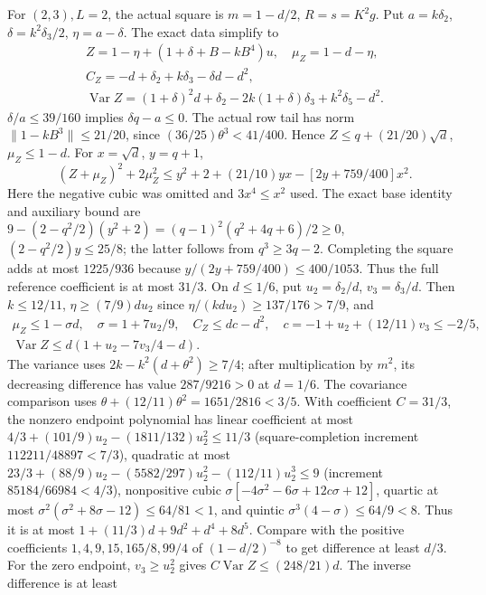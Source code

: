 For $(2,3),L=2$, the actual square is $m=1-d/2$, $R=s=K^2g$.
Put $a=k\delta_2$, $\delta=k^2\delta_3/2$, $\eta=a-\delta$.
The exact data simplify to
\begin{equation}\tag{L77.2.1}\label{eq:L77:23}
\begin{gathered}
Z=1-\eta+(1+\delta+B-kB^4)u,\quad\mu_Z=1-d-\eta,\\
C_Z=-d+\delta_2+k\delta_3-\delta d-d^2,\\
\operatorname{Var}Z=(1+\delta)^2d+\delta_2
-2k(1+\delta)\delta_3+k^2\delta_5-d^2.
\end{gathered}
\end{equation}
$\delta/a\le39/160$ implies $\delta q-a\le0$.
The actual row tail has norm $\|1-kB^3\|\le21/20$, since
$(36/25)\theta^3<41/400$.
Hence $Z\le q+(21/20)\sqrt d$, $\mu_Z\le1-d$.
For $x=\sqrt d$, $y=q+1$,
\[
(Z+\mu_Z)^2+2\mu_Z^2
\le y^2+2+(21/10)yx-[2y+759/400]x^2.
\]
Here the negative cubic was omitted and $3x^4\le x^2$ used.
The exact base identity and auxiliary bound are
$9-(2-q^2/2)(y^2+2)=(q-1)^2(q^2+4q+6)/2\ge0$,
$(2-q^2/2)y\le25/8$; the latter follows from $q^3\ge3q-2$.
Completing the square adds at most $1225/936$ because
$y/(2y+759/400)\le400/1053$.
Thus the full reference coefficient is at most $31/3$.
On $d\le1/6$, put $u_2=\delta_2/d$, $v_3=\delta_3/d$.
Then $k\le12/11$, $\eta\ge(7/9)du_2$ since
$\eta/(kdu_2)\ge137/176>7/9$, and
\[
\begin{gathered}
\mu_Z\le1-\sigma d,\quad \sigma=1+7u_2/9,\quad C_Z\le dc-d^2,\quad c=-1+u_2+(12/11)v_3\le-2/5,\\
\operatorname{Var}Z\le d(1+u_2-7v_3/4-d).
\end{gathered}
\]
The variance uses $2k-k^2(d+\theta^2)\ge7/4$; after multiplication
by $m^2$, its decreasing difference has value $287/9216>0$ at
$d=1/6$. The covariance comparison uses
$\theta+(12/11)\theta^2=1651/2816<3/5$.
With coefficient $C=31/3$, the nonzero endpoint polynomial has
linear coefficient at most
$4/3+(101/9)u_2-(1811/132)u_2^2\le11/3$
(square-completion increment $112211/48897<7/3$), quadratic at most
$23/3+(88/9)u_2-(5582/297)u_2^2-(112/11)u_2^3\le9$
(increment $85184/66984<4/3$), nonpositive cubic
$\sigma[-4\sigma^2-6\sigma+12c\sigma+12]$, quartic at most
$\sigma^2(\sigma^2+8\sigma-12)\le64/81<1$, and quintic
$\sigma^3(4-\sigma)\le64/9<8$.
Thus it is at most $1+(11/3)d+9d^2+d^4+8d^5$.
Compare with the positive coefficients
$1,4,9,15,165/8,99/4$ of $(1-d/2)^{-8}$ to get difference
at least $d/3$.
For the zero endpoint, $v_3\ge u_2^2$ gives
$C\operatorname{Var}Z\le(248/21)d$.
The inverse difference is at least
